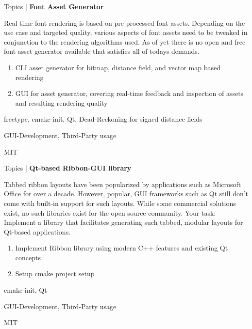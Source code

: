 \begin{frame}{Topics | \textbf{Font Asset Generator}}
	
	\begin{description}[C++ Competencies]
		\item[Description] Real-time font rendering is based on pre-processed font assets. Depending on the use case and targeted quality, various aspects of font assets need to be tweaked in conjunction to the rendering algorithms used. As of yet there is no open and free font asset generator available that satisfies all of todays demands.
		\item[Goals]
			\begin{enumerate}
				\item CLI asset generator for bitmap, distance field, and vector map based rendering
				\item GUI for asset generator, covering real-time feedback and inspection of assets and resulting rendering quality
			\end{enumerate}
		\item[Starting Points] freetype, cmake-init, Qt, Dead-Reckoning for signed distance fields
		\item[C++ Competencies] GUI-Development, Third-Party usage
		\item[License] MIT
	\end{description}
	
\end{frame}


\begin{frame}{Topics | \textbf{Qt-based Ribbon-GUI library}}
			
	\begin{description}[C++ Competencies]
		\item[Description] Tabbed ribbon layouts have been popularized by applications such as Microsoft Office for over a decade. However, popular, GUI frameworks such as Qt still don't come with built-in support for such layouts. While some commercial solutions exist, no such libraries exist for the open source community. Your task: Implement a library that facilitates generating such tabbed, modular layouts for Qt-based applications.
		\item[Goals]
			\begin{enumerate}
				\item Implement Ribbon library using modern C++ features and existing Qt concepts
				\item Setup cmake project setup
			\end{enumerate}
		\item[Starting Points] cmake-init, Qt
		\item[C++ Competencies] GUI-Development, Third-Party usage
		\item[License] MIT
	\end{description}
	
\end{frame}


